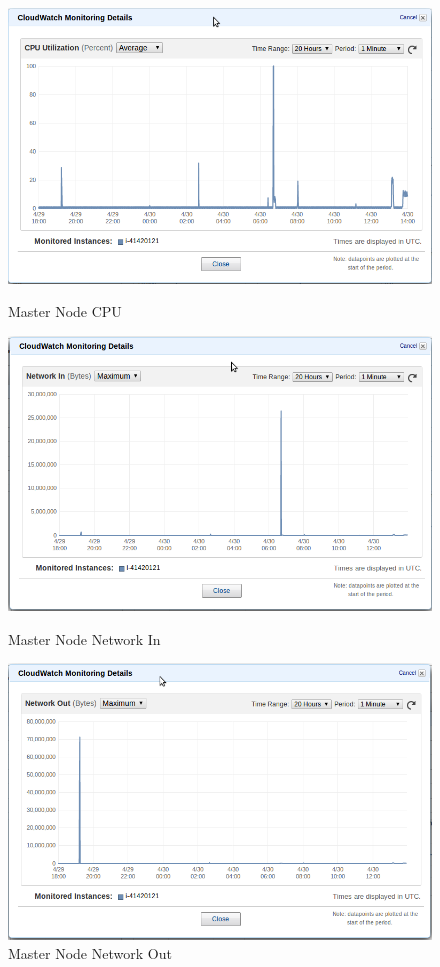 \begin{figure}
  \includegraphics[width=\linewidth]{pics/master_cpu.png}
  \caption{Master Node CPU}\label{fig:master_cpu}
\endminipage\hfill
{}
  \includegraphics[width=\linewidth]{pics/master_network_in.png}
  \caption{Master Node Network In}\label{fig:master_in}
\endminipage\hfill
{}
  \includegraphics[width=\linewidth]{pics/master_network_out.png}
  \caption{Master Node Network Out}\label{fig:master_out}
\endminipage\hfill
\end{figure}

